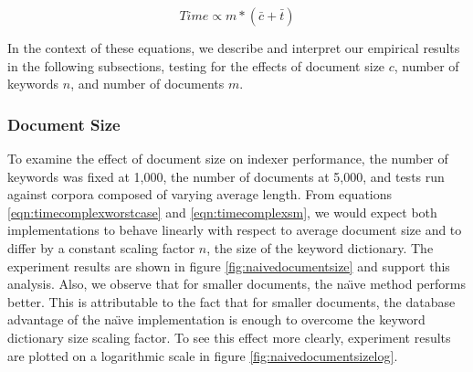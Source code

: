 \documentclass[10pt]{article}
\begin{document}
\begin{equation}
\label{eqn:timecomplexsm}
Time \propto m * ( \bar{c}  + \bar{t} )
\end{equation}

In the context of these equations, we describe and interpret our
empirical results in the following subsections, testing for the effects
of document size $c$, number of keywords $n$, and number of documents
$m$.


\subsubsection{Document Size}
To examine the effect of document size on indexer performance, the
number of keywords was fixed at 1,000, the number of documents at
5,000, and tests run against corpora composed of varying average
length. From equations \ref{eqn:timecomplexworstcase} and
\ref{eqn:timecomplexsm}, we would expect both implementations to
behave linearly with respect to average document size and to differ by
a constant scaling factor $n$, the size of the keyword dictionary. The
experiment results are shown in figure \ref{fig:naivedocumentsize} and
support this analysis. Also, we observe that for smaller
documents, the na\"{\i}ve method performs better. This is attributable
to the fact that for smaller documents, the database advantage of the
na\"{\i}ve implementation is enough to overcome the keyword dictionary
size scaling factor. To see this effect more clearly, experiment
results are plotted on a logarithmic scale in figure
\ref{fig:naivedocumentsizelog}.
\end{document}
